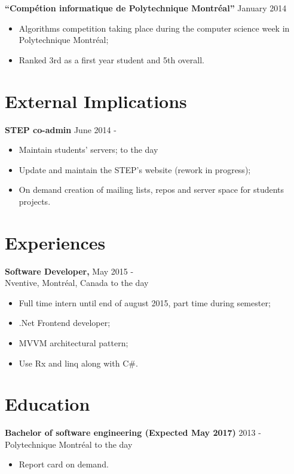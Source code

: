 \documentclass[margin]{res}
\begin{document}
\begin{resume}
  {\bf ``Comp\'{e}tion informatique de Polytechnique Montr\'{e}al''} \hfill January 2014
  \begin{itemize} \itemsep -2pt
  \item Algorithms competition taking place during the computer science week in Polytechnique  Montr\'{e}al;
  \item Ranked 3rd as a first year student and 5th overall.
  \end{itemize}


  \section{External Implications}
  
  {\bf STEP co-admin} \hfill June 2014 -
  \begin{itemize} \itemsep -3pt
  \item Maintain students' servers; \hfill to the day
  \item Update and maintain the STEP's website (rework in progress);
  \item On demand creation of mailing lists, repos and server space for students projects.
  \end{itemize}
  
  
  \section{Experiences}

  {\bf Software Developer,} \hfill May 2015 -\\
  Nventive, Montr\'eal, Canada \hfill to the day
  \begin{itemize} \itemsep -3pt  %
  \item Full time intern until end of august 2015, part time during semester;
  \item .Net Frontend developer;
  \item MVVM  architectural pattern;
  \item Use Rx and linq along with C\#.
  \end{itemize}
  
    

  \section{Education}
  
  {\bf Bachelor of software engineering (Expected May 2017)} \hfill 2013 -\\ 
  Polytechnique Montr\'{e}al \hfill to the day
  \begin{itemize} \itemsep -3pt
  \item Report card on demand.
  \end{itemize}
  

\end{resume}
\end{document}
